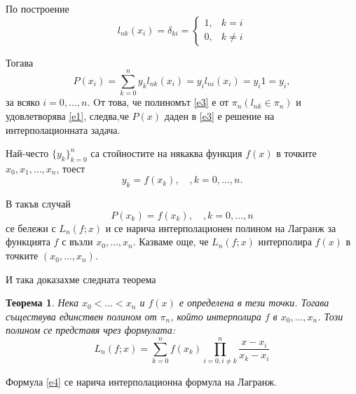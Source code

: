 \documentclass[12pt]{article}
\numberwithin{equation}{subsection}
\newtheorem{theorem}{Теорема}
\numberwithin{theorem}{subsection}
\numberwithin{definition}{subsection}
\numberwithin{corollary}{subsection}
\begin{document}
  По построение
  \begin{equation*}
  l_{nk}(x_i) = \delta_{ki} = 
  \begin{cases}
  1, &k = i\\
  0, &k \neq i
  \end{cases}
  \end{equation*}
  \par
  Тогава
  \begin{equation*}
  P(x_i) = \displaystyle\sum_{k = 0}^ny_kl_{nk}(x_i) = y_il_{ni}(x_i) = y_i1 = y_i,
  \end{equation*}
  за всяко $i = 0,\dotso,n$. Oт това, че полиномът \ref{e3} е от $\pi_n (l_{nk}\in\pi_n)$ и удовлетворява \ref{e1}, следва,че $P(x)$ даден в \ref{e3} е решение на интерполационната задача.
  \par
  Най-често $\{y_k\}_{k=0}^n$ са стойностите на някаква функция $f(x)$ в точките $x_0, x_1,\dotso, x_n$, тоест
  \begin{equation*}
  y_k = f(x_k),\hspace{12pt}, k = 0, \dotso, n.
  \end{equation*}
  \par
  В такъв случай
  \begin{equation*}
  P(x_k) = f(x_k),\hspace{12pt}, k = 0, \dotso, n
  \end{equation*}
  се бележи с $L_n(f;x)$ и се нарича интерполационен полином на Лагранж за функцията $f$ с възли $x_0, \dotso, x_n$. Казваме още, че $L_n(f;x)$ интерполира $f(x)$ в точките $(x_0, \dotso, x_n)$.
  \par
  И така доказахме следната теорема
  \begin{theorem}\label{T1}
  Нека $x_0 < \dotso < x_n$ и $f(x)$ е определена в тези точки. Тогава съществува единствен полином от $\pi_n$, който интерполира $f$ в $x_0, \dotso, x_n$. Този полином се представя чрез формулата:
  \begin{equation}\label{e4}
  L_n(f;x) = \displaystyle\sum_{k=0}^nf(x_k)
              \displaystyle\prod_{i = 0, i \neq k}^n\frac{x-x_i}{x_k-x_i}
  \end{equation}
  \end{theorem}
  \par
  Формула \ref{e4} се нарича интерполационна формула на Лагранж.
\end{document}
